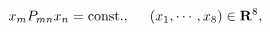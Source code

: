 \begin{equation}
x_mP_{mn}x_n = \mbox{const.}, \hspace{5mm} (x_1,\cdots,x_8) \in {\bf R}^8,
\end{equation}

